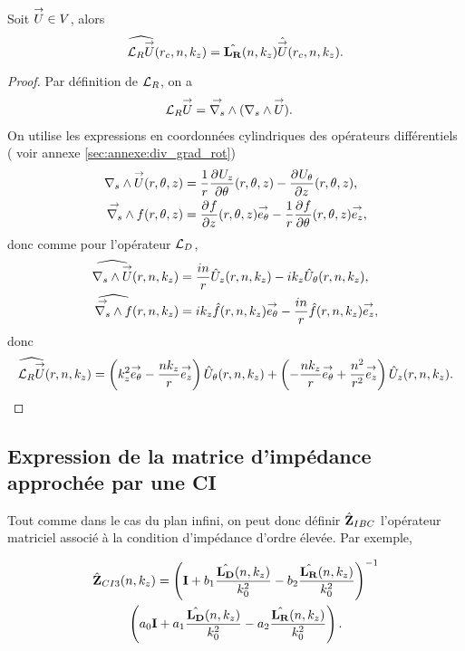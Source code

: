     \begin{prop}
      Soit \(\vect{U} \in V\), alors
      \begin{equation*}
        \widehat{\LR \vect{U}} (r_c,n,k_z) = \hat{\mLR}(n,k_z) \hat{\vect{U}}(r_c,n,k_z).
      \end{equation*}
    \end{prop}

    \begin{proof}
      Par définition de \(\LR\), on a
      \begin{align*}
        \LR \vect{U} & = \vrots{} (\rots{} \vect{U}).
      \end{align*}
      On utilise les expressions en coordonnées cylindriques des opérateurs différentiels ( voir annexe \ref{sec:annexe:div_grad_rot})
      \begin{align*}
        \rots{\vect{U}}(r,\theta,z) &= \frac{1}{r}\ddr{\theta}{U_z}(r,\theta,z) - \ddr{z}{U_\theta}(r,\theta,z),
        \\
        \vrots{f}(r,\theta,z) &= \ddr{z}{f}(r,\theta,z)\vect{e_\theta} - \frac{1}{r}\ddr{\theta}{f}(r,\theta,z)\vect{e_z},
      \end{align*}
      donc comme pour l'opérateur \(\LD\),
      \begin{align*}
        \widehat{\rots{\vect{U}}}(r,n,k_z) &= \frac{in}{r}{\hat{U}_z}(r,n,k_z) - ik_z{\hat{U}_\theta}(r,n,k_z),
        \\
        \widehat{\vrots{f}}(r,n,k_z) &=  ik_z\hat{f}(r,n,k_z)\vect{e_\theta} - \frac{in}{r}\hat{f}(r,n,k_z)\vect{e_z},
      \end{align*}
      donc
      \begin{align*}
        \widehat{\LR{\vect{U}}}(r,n,k_z) =  \left({k_z^2}\vect{e_\theta} - \frac{nk_z}{r}\vect{e_z}\right){\hat{U}_\theta}(r,n,k_z) + \left(-\frac{nk_z}{r}\vect{e_\theta} + \frac{n^2}{r^2}\vect{e_z}\right){\hat{U}_z}(r,n,k_z).
      \end{align*}

    \end{proof}

  \subsection{Expression de la matrice d'impédance approchée par une CI}

    Tout comme dans le cas du plan infini, on peut donc définir \(\hat{\mZ}_{IBC}\) l’opérateur matriciel associé à la condition d'impédance d'ordre élevée. Par exemple,

    \begin{multline}
      \label{eq:cylindre:hoibc:ci3}
      \hat{\mZ}_{CI3}(n,k_z) = \left(\mI + b_1 \frac{\hat{\mLD}(n,k_z)}{k_0^2} - b_2 \frac{\hat{\mLR}(n,k_z)}{k_0^2} \right)^{-1}\\\left(a_0 \mI + a_1 \frac{\hat{\mLD}(n,k_z)}{k_0^2} - a_2 \frac{\hat{\mLR}(n,k_z)}{k_0^2}\right).
    \end{multline}

